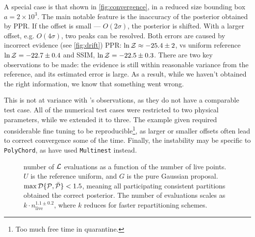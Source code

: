 \documentclass[usenatbib]{mnras}
\begin{document}
A special case is that shown in \cref{fig:convergence}, in a reduced
size bounding box \(a=2\times 10^{3}\). The main notable feature is
the inaccuracy of the posterior obtained by PPR. If the offset is
small --- \(O(2\sigma)\), the posterior is shifted. With a larger
offset, e.g. \(O(4\sigma)\), two peaks can be resolved.  Both errors
are caused by incorrect evidence (see \cref{fig:drift}) PPR:
\(\ln {\cal Z}\approx -25.4 \pm 2\), vs uniform reference
\(\ln {\cal Z} = -22.7 \pm 0.4\) and SSIM,
\(\ln {\cal Z} = -22.5 \pm 0.3\). There are two key observations to be
made: the evidence is still within reasonable variance from the
reference, and its estimated error is large. As a result, while we
haven't obtained the right information, we know that something went
wrong.

This is not at variance with \cite{chen-ferroz-hobson}'s observations,
as they do not have a comparable test case. All of the numerical test
cases were restricted to two physical parameters, while we extended it
to three. The example given required considerable fine tuning to be
reproducible\footnote{Too much free time in quarantine. }, as larger
or smaller offsets often lead to correct convergence some of the
time. Finally, the instability may be specific to \texttt{PolyChord},
as \citeauthor{chen-ferroz-hobson} have used \texttt{Multinest}
\citep{multinest} instead.


\begin{figure}
  
  \caption{number of ${\cal L}$ evaluations as a function of the
    number of live points. \(U\) is the reference uniform, and \(G\)
    is the pure Gaussian proposal.
    \(\max {\cal D}\{{\cal P}, \bar{\cal P}\} < 1.5\), meaning all
    participating consistent partitions obtained the correct
    posterior. The number of evaluations scales as
    $k\cdot n_\text{live}^{1.1 \pm 0.2}$, where $k$ reduces for faster
    repartitioning schemes. \label{fig:benchmark}}
\end{figure}
\end{document}
